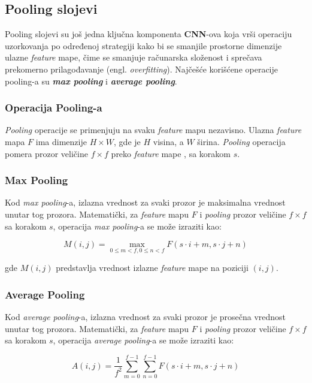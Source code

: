 \documentclass[12pt]{article}
\begin{document}
    \subsection*{Pooling slojevi}
   Pooling slojevi su još jedna ključna komponenta \textbf{CNN}-ova koja vrši operaciju uzorkovanja po određenoj strategiji kako bi 
   se smanjile prostorne dimenzije ulazne \textit{feature} mape, čime se smanjuje 
   računarska složenost i sprečava prekomerno prilagođavanje (engl. \textit{overfitting}). 
   Najčešće korišćene operacije pooling-a su \textbf{\textit{max pooling}} i \textbf{\textit{average pooling}}.
   \subsubsection*{Operacija Pooling-a}
   \textit{Pooling} operacije se primenjuju na svaku \textit{feature} mapu nezavisno. 
   Ulazna \textit{feature} mapa \( F \) ima dimenzije \( H \times W \), gde je \( H \) visina, 
   a \( W \) širina. \textit{Pooling} operacija pomera prozor veličine \( f \times f \) preko \textit{feature} mape
   , sa korakom \( s \).

   \subsubsection*{Max Pooling}

   Kod \textit{max pooling}-a, izlazna vrednost za svaki prozor je maksimalna vrednost 
   unutar tog prozora. Matematički, za \textit{feature} mapu \( F \) i \textit{pooling} prozor 
   veličine \( f \times f \) sa korakom \( s \), 
   operacija \textit{max pooling}-a se može izraziti kao:

   \[
   M(i, j) = \max_{0 \leq m < f, 0 \leq n < f} F(s \cdot i + m, s \cdot j + n)
   \]

   gde \( M(i, j) \) predstavlja vrednost izlazne \textit{feature} mape na poziciji \((i, j)\).

   \subsubsection*{Average Pooling}

   Kod \textit{average pooling}-a, izlazna vrednost za svaki prozor je prosečna vrednost unutar tog 
   prozora. Matematički, za \textit{feature} mapu \( F \) i \textit{pooling} prozor veličine 
   \( f \times f \) sa korakom \( s \), 
   operacija \textit{average pooling}-a se može izraziti kao:

   \[
   A(i, j) = \frac{1}{f^2} \sum_{m=0}^{f-1} \sum_{n=0}^{f-1} F(s \cdot i + m, s \cdot j + n)
   \]
\end{document}

